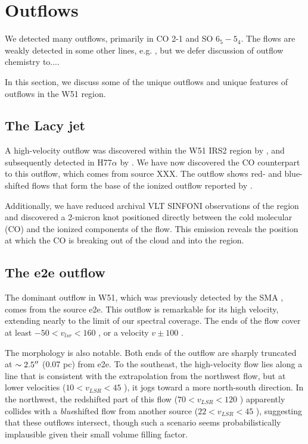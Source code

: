 \documentclass{aa}
\begin{document}
\section{Outflows}
\label{sec:outflows}
We detected many outflows, primarily in CO 2-1 and SO $6_5-5_4$.  The flows are weakly detected in some
other lines, e.g. \formaldehyde, but we defer discussion of outflow chemistry to....

In this section, we discuss some of the unique outflows and unique features of
outflows in the W51 region.  

\subsection{The Lacy jet}
A high-velocity outflow was discovered within the W51 IRS2 region by
\citet{Lacy2007a}, and subsequently detected in H77$\alpha$ by
\citet{Ginsburg2016b}.  We have now discovered the CO counterpart to this
outflow, which comes from source XXX.   The outflow shows red- and blue-shifted
flows that form the base of the ionized outflow reported by \citet{Lacy2007a}.

Additionally, we have reduced archival VLT SINFONI observations of the region
and discovered a 2-micron \hh knot positioned directly between the cold
molecular (CO) and the ionized components of the flow.  This \hh emission
reveals the position at which the CO is breaking out of the cloud and into the
\hii region.

\subsection{The e2e outflow}
The dominant outflow in W51, which was previously detected by the SMA \citep{},
comes from the source e2e.  This outflow is remarkable for its high velocity,
extending nearly to the limit of our spectral coverage.  The ends of the flow
cover at least $-50 < v_{lsr} < 160$ \kms, or a velocity $v\pm100$ \kms.  

The morphology is also notable.  Both ends of the outflow are sharply truncated
at $\sim2.5\mbox{$^{\prime\prime}$}$ (0.07 pc) from e2e. To the southeast, the high-velocity
flow lies along a line that is consistent with the extrapolation from the
northwest flow,
but at lower velocities ($10 < v_{LSR} < 45$ \kms), it jogs toward a more
north-south direction.  In the northwest, the redshifted part of this flow ($70
< v_{LSR} < 120$ \kms) apparently collides with a \emph{blue}shifted flow from
another source ($22 < v_{LSR} < 45$ \kms), suggesting that these outflows
intersect, though such a scenario seems probabilistically implausible given
their small volume filling factor.
\end{document}
